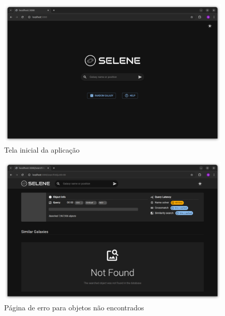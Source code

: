 \begin{figure}[!ht]
  \centering
  \caption{Tela inicial da aplicação}
  \label{fig:tela-home}
  \includegraphics[width=\linewidth]{figures/screen-1.png}
\end{figure}

\begin{figure}[!ht]
  \centering
  \caption{Página de erro para objetos não encontrados}
  \label{fig:tela-erro}
  \includegraphics[width=\linewidth]{figures/screen-4.png}
\end{figure}


